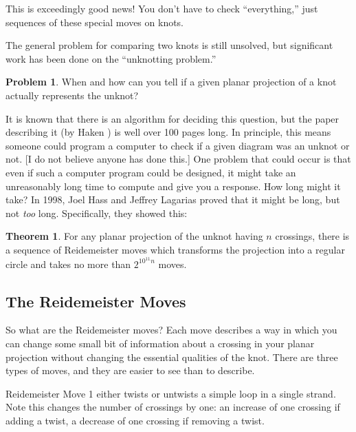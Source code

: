 \documentclass[12pt,letterpaper]{article}
\theoremstyle{definition}
\newtheorem*{theorem}{Theorem}
\newtheorem*{problem}{Problem}
\begin{document}
This is exceedingly good news! 
You don't have to check ``everything,'' just sequences of these special moves on knots.  

The general problem for comparing two knots is still unsolved, but significant work has been done on the ``unknotting problem.''
\begin{problem}
When and how can you tell if a given planar projection of a knot actually represents the unknot?
\end{problem}
It is known that there is an algorithm for deciding this question, but the paper describing it  (by Haken \cite{Haken}) is well over 100 pages long. 
In principle, this means someone could program a computer to check if a given diagram was an unknot or not. 
[I do not believe anyone has done this.] 
One problem that could occur is that even if such a computer program could be designed, it might take an unreasonably long time to compute and give you a response. 
How long might it take? 
In 1998, Joel Hass and Jeffrey Lagarias proved that it might be long, but not \emph{too} long. 
Specifically, they showed this:
\begin{theorem}
For any planar projection of the unknot having $n$ crossings, there is a sequence of Reidemeister moves which transforms the projection into a regular circle and takes no more than $2^{10^{11}n}$ moves.
\end{theorem}



\subsection*{The Reidemeister Moves}

So what are the Reidemeister moves? 
Each move describes a way in which you can change some small bit of information about a crossing in your planar projection without changing the essential qualities of the knot. 
There are three types of moves, and they are easier to see than to describe.

Reidemeister Move 1 either twists or untwists a simple loop in a single strand. 
Note this changes the number of crossings by one: an increase of one crossing if adding a twist, a decrease of one crossing if removing a twist.
\end{document}
